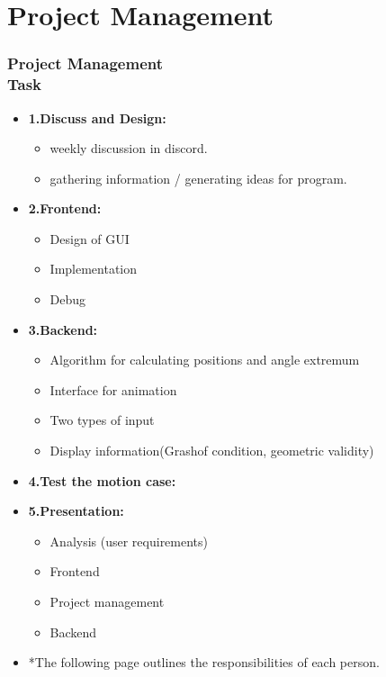 \documentclass[ucs,10pt]{beamer}
\begin{document}
\section{Project Management}

\begin{frame}
\frametitle{Project Management \\
	\small \color{rwth-blue} Task}
	\begin{itemize}
			\item \textbf{1.Discuss and Design:}
				\begin{itemize}
					\item weekly discussion in discord.
					\item gathering information / generating ideas for program.
				\end{itemize}
			\item \textbf{2.Frontend:}
				\begin{itemize}
					\item Design of GUI
					\item Implementation
					\item Debug
				\end{itemize}
			\item \textbf{3.Backend:}
				\begin{itemize}
				\item Algorithm for calculating positions and angle extremum
				\item Interface for animation
				\item Two types of input
				\item Display information(Grashof condition, geometric validity)
				\end{itemize}
			\item \textbf{4.Test the motion case:}
			\item \textbf{5.Presentation:}
				\begin{itemize}
				\item Analysis (user requirements)
				\item Frontend
				\item Project management
				\item Backend
				\end{itemize}
			\item *The following page outlines the responsibilities of each person.
	\end{itemize}
\end{frame}
\end{document}
